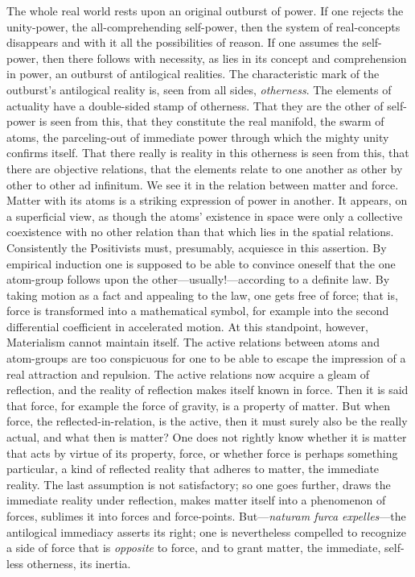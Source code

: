 \documentclass[12pt]{article}
\begin{document}
The whole real world rests upon an original outburst of power. If one
rejects the unity-power, the all-comprehending self-power, then the system
of real-concepts disappears and with it all the possibilities of reason. If
one assumes the self-power, then there follows with necessity, as lies in
its concept and comprehension in power, an outburst of antilogical
realities. The characteristic mark of the outburst's antilogical reality is,
seen from all sides, \emph{otherness}. The elements of actuality have a
double-sided stamp of otherness. That they are the other of self-power is
seen from this, that they constitute the real manifold, the swarm of atoms,
the parceling-out of immediate power through which the mighty unity confirms
itself. That there really is reality in this otherness is seen from this,
that there are objective relations, that the elements relate to one another
as other by other to other ad infinitum. We see it in the relation between
matter and force. Matter with its atoms is a striking expression of power in
another. It appears, on a superficial view, as though the atoms' existence
in space were only a collective coexistence with no other relation than that
which lies in the spatial relations. Consistently the Positivists must,
presumably, acquiesce in this assertion. By empirical induction one is
supposed to be able to convince oneself that the one atom-group follows
upon the other---usually!---according to a definite law. By taking motion as
a fact and appealing to the law, one gets free of force; that is, force is
transformed into a mathematical symbol, for example into the second
differential coefficient in accelerated motion. At this standpoint, however,
Materialism cannot maintain itself. The active relations between atoms and
atom-groups are too conspicuous for one to be able to escape the impression
of a real attraction and repulsion. The active relations now acquire a gleam
of reflection, and the reality of reflection makes itself known in force.
Then it is said that force, for example the force of gravity, is a property
of matter. But when force, the reflected-in-relation, is the active, then it
must surely also be the really actual, and what then is matter? One does not
rightly know whether it is matter that acts by virtue of its property,
force, or whether force is perhaps something particular, a kind of reflected
reality that adheres to matter, the immediate reality. The last assumption
is not satisfactory; so one goes further, draws the immediate reality under
reflection, makes matter itself into a phenomenon of forces, sublimes it
into forces and force-points. But---\textit{naturam furca expelles}---the
antilogical immediacy asserts its right; one is nevertheless compelled to
recognize a side of force that is \emph{opposite} to force, and to grant
matter, the immediate, self-less otherness, its inertia.
\end{document}
